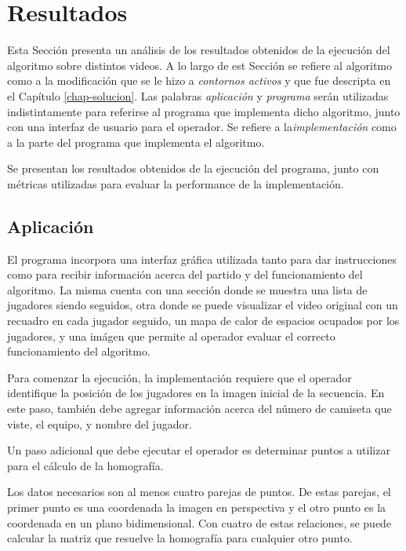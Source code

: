 \chapter{Resultados}
\label{chap-results}

Esta Sección presenta un análisis de los resultados obtenidos de la ejecución del algoritmo sobre distintos videos. A lo largo de est Sección se refiere al algoritmo como a la modificación que se le hizo a \textit{contornos activos} y que fue descripta en el Capítulo \ref{chap-solucion}. Las palabras \textit{aplicación} y \textit{programa} serán utilizadas indistintamente para referirse al programa que implementa dicho algoritmo, junto con una interfaz de usuario para el operador. Se refiere a la\textit{implementación} como a la parte del programa que implementa el algoritmo.

Se presentan los resultados obtenidos de la ejecución del programa, junto con métricas utilizadas para evaluar la performance de la implementación.

\section{Aplicación}

El programa incorpora una interfaz gráfica utilizada tanto para dar instrucciones como para recibir información acerca del partido y del funcionamiento del algoritmo. La misma cuenta con una sección donde se muestra una lista de jugadores siendo seguidos, otra donde se puede visualizar el video original con un recuadro en cada jugador seguido, un mapa de calor de espacios ocupados por los jugadores, y una imágen que permite al operador evaluar el correcto funcionamiento del algoritmo.

Para comenzar la ejecución, la implementación requiere que el operador identifique la posición de los jugadores en la imagen inicial de la secuencia. En este paso, también debe agregar información acerca del número de camiseta que viste, el equipo, y nombre del jugador.

Un paso adicional que debe ejecutar el operador es determinar puntos a utilizar para el cálculo de la homografía.

Los datos necesarios son al menos cuatro parejas de puntos. De estas parejas, el primer punto es una coordenada la imagen en perspectiva y el otro punto es la coordenada en un plano bidimensional. Con cuatro de estas relaciones, se puede calcular la matriz que resuelve la homografía para cualquier otro punto.  


